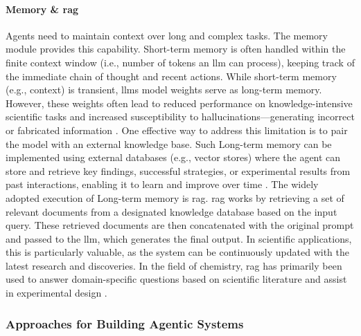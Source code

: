 \paragraph{Memory \& \gls{rag} }
\label{sec:rag}
Agents need to maintain context over long and complex tasks. The memory module provides this capability. Short-term memory is often handled within the finite context window (i.e., number of tokens an \gls{llm} can process), keeping track of the immediate chain of thought and recent actions.
While short-term memory (e.g., context) is transient, \glspl{llm} model weights serve as long-term memory. However, these weights often lead to reduced performance on knowledge-intensive scientific tasks and increased susceptibility to hallucinations---generating incorrect or fabricated information \autocite{marcus2020next}.
One effective way to address this limitation is to pair the model with an external knowledge base.\autocite{lewis2020retrieval} Such Long-term memory can be implemented using external databases (e.g., vector stores) where the agent can store and retrieve key findings, successful strategies, or experimental results from past interactions, enabling it to learn and improve over time \autocite{chen2023chemist}. The widely adopted execution of Long-term memory is \gls{rag}. \gls{rag} works by retrieving a set of relevant documents from a designated knowledge database based on the input query. These retrieved documents are then concatenated with the original prompt and passed to the \gls{llm}, which generates the final output. In scientific applications, this is particularly valuable, as the system can be continuously updated with the latest research and discoveries. In the field of chemistry, \gls{rag} has primarily been used to answer domain-specific questions based on scientific literature and assist in experimental design \autocite{chen2023chemist, skarlinski2024language}.


\subsubsection{Approaches for Building Agentic Systems}

